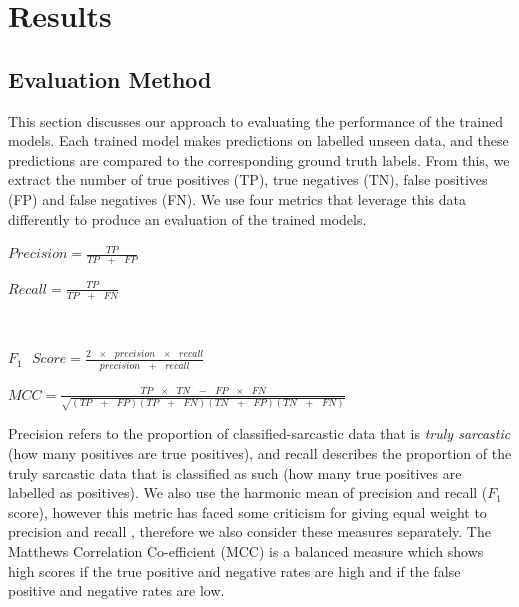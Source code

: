 \documentclass[12pt,a4paper]{article}
\begin{document}
\section{Results}\vspace{-8pt}
\subsection{Evaluation Method}\vspace{-5pt}
\noindent This section discusses our approach to evaluating the performance of the trained models. Each trained model makes predictions on labelled unseen data, and these predictions are compared to the corresponding ground truth labels. From this, we extract the number of true positives (TP), true negatives (TN), false positives (FP) and false negatives (FN). We use four metrics that leverage this data differently to produce an evaluation of the trained models.\vspace{-10pt}

\hspace{-30pt}\begin{center}
	\begin{minipage}{0.47\textwidth}
		$Precision =\frac{TP}{TP\text{ } + \text{ }FP}$\\
	\end{minipage}
	\hspace{-30pt}\begin{minipage}{0.47\textwidth}
		$Recall =\frac{TP}{TP\text{ } + \text{ }FN}$\\
	\end{minipage}\\
\end{center}
\vspace{-20pt}
\begin{center}
	\begin{minipage}{0.47\textwidth}
		$F_1\text{ } Score =\frac{2 \text{ }\times\text{ } precision\text{ } \times \text{ }recall}{precision\text{ } + \text{ }recall}$
	\end{minipage}
	\hspace{-30pt}\begin{minipage}{0.47\textwidth}
		$MCC =\frac{TP \text{ } \times \text{ } TN \text{ } - \text{ } FP\text{ } \times \text{ } FN}{\sqrt{(TP \text{ } + \text{ } FP)(TP \text{ } + \text{ } FN)(TN \text{ } + \text{ } FP)(TN \text{ } + \text{ } FN)}}$
	\end{minipage}
\end{center}

\noindent Precision refers to the proportion of classified-sarcastic data that is \textit{truly sarcastic} (how many positives are true positives), and recall describes the proportion of the truly sarcastic data that is classified as such (how many true positives are labelled as positives). We also use the harmonic mean of precision and recall ($F_{1}$ score), however this metric has faced some criticism for giving equal weight to precision and recall \cite{hand2018note}, therefore we also consider these measures separately. The Matthews Correlation Co-efficient (MCC) is a balanced measure which shows high scores if the true positive and negative rates are high and if the false positive and negative rates are low.
\end{document}
